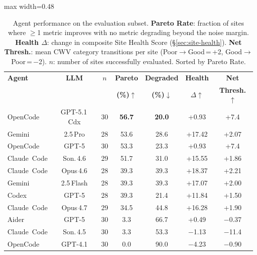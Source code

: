 \begin{table}[t]
\centering
\small
\caption{Agent performance on the evaluation subset. \textbf{Pareto Rate}: fraction of sites where $\geq$1 metric improves with no metric degrading beyond the noise margin. \textbf{Health $\Delta$}: change in composite Site Health Score (\S\ref{sec:site-health}). \textbf{Net Thresh.}: mean CWV category transitions per site (Poor$\to$Good\,=\,+2, Good$\to$Poor\,=\,$-$2). $n$: number of sites successfully evaluated. Sorted by Pareto Rate.}
\label{tab:main-results}
\begin{adjustbox}{max width=0.48\textwidth}
\begin{tabular}{lcccccc}
\toprule
\textbf{Agent} & \textbf{LLM} & $n$ & \textbf{Pareto} & \textbf{Degraded} & \textbf{Health} & \textbf{Net}  \\
 &  & & \textbf{(\%)}$\uparrow$ & \textbf{(\%)}$\downarrow$ & \textbf{$\Delta$}$\uparrow$ & \textbf{Thresh.}$\uparrow$  \\
\midrule
OpenCode    & GPT-5.1\,Cdx   & 30 & \textbf{56.7} & \textbf{20.0} & +0.93  & +7.4  \\
Gemini      & 2.5\,Pro       & 28 & 53.6          & 28.6          & +17.42 & +2.07 \\
OpenCode    & GPT-5          & 30 & 53.3          & 23.3          & +0.93  & +7.4  \\
Claude~Code & Son.\,4.6      & 29 & 51.7          & 31.0          & +15.55 & +1.86 \\
\midrule
Claude~Code & Opus\,4.6      & 28 & 39.3          & 39.3          & +18.37 & +2.21 \\
Gemini      & 2.5\,Flash     & 28 & 39.3          & 39.3          & +17.07 & +2.00 \\
Codex       & GPT-5          & 28 & 39.3          & 21.4          & +11.84 & +1.50 \\
Claude~Code & Opus\,4.7      & 29 & 34.5          & 44.8          & +16.28 & +1.90 \\
\midrule
Aider       & GPT-5          & 30 &  3.3          & 66.7          & +0.49  & $-$0.37 \\
Claude~Code & Son.\,4.5      & 30 &  3.3          & 53.3          & $-$1.13 & $-$11.4 \\
OpenCode    & GPT-4.1        & 30 &  0.0          & 90.0          & $-$4.23 & $-$0.90 \\
\bottomrule
\end{tabular}
\end{adjustbox}
\end{table}

